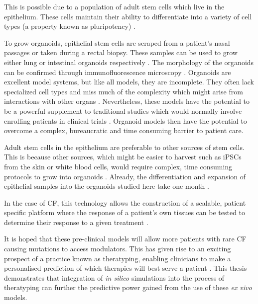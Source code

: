 This is possible due to a population of adult stem cells which live in the epithelium. These cells maintain their ability to differentiate into a variety of cell types (a property known as pluripotency) \cite{blanpain2007}. 

To grow organoids, epithelial stem cells are scraped from a patient's nasal passages or taken during a rectal biopsy. These samples can be used to grow either lung or intestinal organoids respectively  \cite{awatade2021,sato2011}. The morphology of the organoids can be confirmed through immunofluorescence microscopy \cite{awatade2021, im2019}. Organoids are excellent model systems, but like all models, they are incomplete. They often lack specialized cell types and miss much of the complexity which might arise from interactions with other organs \cite{clevers2016}. 
Nevertheless, these models have the potential to be a powerful supplement to traditional studies which would normally involve enrolling patients in clinical trials \cite{pranke2019a}. Organoid models then have the potential to overcome a complex, bureaucratic and time consuming barrier to patient care.

Adult stem cells in the epithelium are preferable to other sources of stem cells. This is because other sources, which might be easier to harvest such as iPSCs from the skin or white blood cells, would require complex, time consuming protocols to grow into organoids \cite{wong2012}. Already, the differentiation and expansion of epithelial samples into the organoids studied here take one month \cite{sato2011}.

In the case of CF, this technology allows the construction of a scalable, patient specific platform where the response of a patient's own tissues can be tested to determine their response to a given treatment \cite{keegan2021, sato2011}. 

It is hoped that these pre-clinical models will allow more patients with rare CF causing mutations to access modulators. This has given rise to an exciting prospect of a practice known as theratyping, enabling clinicians to make a personalised prediction of which therapies will best serve a patient \cite{clancy2019, wong2022, wong2022a, ciciriello2022}. This thesis demonstrates that integration of \textit{in silico} simulations into the process of theratyping can further the predictive power gained from the use of these \textit{ex vivo} models.



